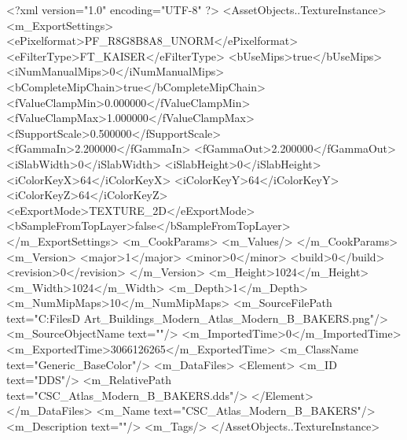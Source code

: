 <?xml version="1.0" encoding="UTF-8" ?>
<AssetObjects..TextureInstance>
	<m_ExportSettings>
		<ePixelformat>PF_R8G8B8A8_UNORM</ePixelformat>
		<eFilterType>FT_KAISER</eFilterType>
		<bUseMips>true</bUseMips>
		<iNumManualMips>0</iNumManualMips>
		<bCompleteMipChain>true</bCompleteMipChain>
		<fValueClampMin>0.000000</fValueClampMin>
		<fValueClampMax>1.000000</fValueClampMax>
		<fSupportScale>0.500000</fSupportScale>
		<fGammaIn>2.200000</fGammaIn>
		<fGammaOut>2.200000</fGammaOut>
		<iSlabWidth>0</iSlabWidth>
		<iSlabHeight>0</iSlabHeight>
		<iColorKeyX>64</iColorKeyX>
		<iColorKeyY>64</iColorKeyY>
		<iColorKeyZ>64</iColorKeyZ>
		<eExportMode>TEXTURE_2D</eExportMode>
		<bSampleFromTopLayer>false</bSampleFromTopLayer>
	</m_ExportSettings>
	<m_CookParams>
		<m_Values/>
	</m_CookParams>
	<m_Version>
		<major>1</major>
		<minor>0</minor>
		<build>0</build>
		<revision>0</revision>
	</m_Version>
	<m_Height>1024</m_Height>
	<m_Width>1024</m_Width>
	<m_Depth>1</m_Depth>
	<m_NumMipMaps>10</m_NumMipMaps>
	<m_SourceFilePath text="C:\Users\Shadow\Desktop\Working Files\3D Art\Textures\CSC_Buildings_Modern\Current\textures\CSC_Atlas_Modern_B_BAKERS.png"/>
	<m_SourceObjectName text=""/>
	<m_ImportedTime>0</m_ImportedTime>
	<m_ExportedTime>3066126265</m_ExportedTime>
	<m_ClassName text="Generic_BaseColor"/>
	<m_DataFiles>
		<Element>
			<m_ID text="DDS"/>
			<m_RelativePath text="CSC_Atlas_Modern_B_BAKERS.dds"/>
		</Element>
	</m_DataFiles>
	<m_Name text="CSC_Atlas_Modern_B_BAKERS"/>
	<m_Description text=""/>
	<m_Tags/>
</AssetObjects..TextureInstance>

